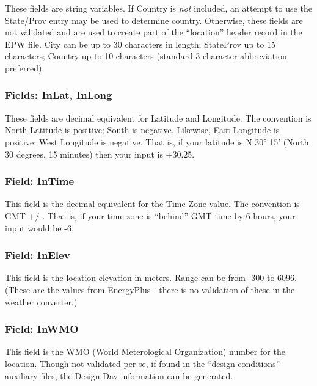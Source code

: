 These fields are string variables. If Country is \emph{not} included, an attempt to use the State/Prov entry may be used to determine country. Otherwise, these fields are not validated and are used to create part of the ``location'' header record in the EPW file. City can be up to 30 characters in length; StateProv up to 15 characters; Country up to 10 characters (standard 3 character abbreviation preferred).

\subsubsection{Fields: InLat, InLong}\label{fields-inlat-inlong}

These fields are decimal equivalent for Latitude and Longitude. The convention is North Latitude is positive; South is negative. Likewise, East Longitude is positive; West Longitude is negative. That is, if your latitude is N 30° 15' (North 30 degrees, 15 minutes) then your input is +30.25.

\subsubsection{Field: InTime}\label{field-intime}

This field is the decimal equivalent for the Time Zone value. The convention is GMT +/-. That is, if your time zone is ``behind'' GMT time by 6 hours, your input would be -6.

\subsubsection{Field: InElev}\label{field-inelev}

This field is the location elevation in meters. Range can be from -300 to 6096. (These are the values from EnergyPlus - there is no validation of these in the weather converter.)

\subsubsection{Field: InWMO}\label{field-inwmo}

This field is the WMO (World Meterological Organization) number for the location. Though not validated per se, if found in the ``design conditions'' auxiliary files, the Design Day information can be generated.

